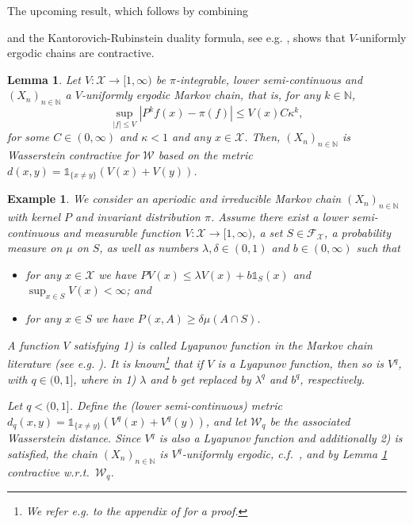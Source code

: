 \documentclass[12pt]{article}
\theoremstyle{plain}
\newtheorem{lem}[thm]{Lemma}
\newtheorem{example}[thm]{Example}
\newcommand{\N}{\mathbb{N}}
\newcommand{\cX}{\mathcal{X}}
\begin{document}
The upcoming result, which follows by combining {\cite[Lemma 2.1]{hairer2011yet} and the Kantorovich-Rubinstein duality formula, see e.g. \cite{villani2009optimal}, shows that $V$-uniformly ergodic chains are contractive. 
\begin{lem}\label{lem:V_uniformly_ergodic_implies_contraction}
Let $V \colon \cX \to [1, \infty)$ be $\pi$-integrable, lower semi-continuous and $(X_n)_{n \in \N}$ a $V$-uniformly ergodic Markov chain, that is, for any $k \in \N$,  
\[
\sup_{\vert f \vert \leq V} \left\vert P^kf(x) - \pi(f) \right\vert \leq V(x)C \kappa^k,
\]
for some $C\in (0, \infty)$ and $\kappa<1$ and any $x \in \cX$. Then,  $(X_n)_{n \in \N}$ is Wasserstein contractive for $\mathcal{W}$ based on the metric $d (x,y) = \mathds{1}_{\{x \neq y\}}(V(x) + V(y))$.
\end{lem}

\begin{example}\label{ex:Lyapunov}
	We consider an aperiodic and irreducible Markov chain $(X_n)_{n \in\N}$ with kernel $P$ and invariant distribution $\pi$. Assume there exist a lower semi-continuous and measurable function $V \colon \cX \to [1, \infty)$, a set $S \in \mathcal{F}_\cX$, a probability measure on $\mu$ on $S$, as well as numbers $\lambda, \delta \in (0,1)$ and $b \in (0, \infty)$ such that 
	\begin{itemize}
		\item[1)] for any $x \in \cX $ we have $PV(x) \leq \lambda V(x) + b \mathds{1}_S(x)$ and $\sup_{x \in S} V(x) < \infty$; and
		\item[2)] for any $x \in S$ we have $P(x, A) \geq\delta \mu(A \cap S)$. 
	\end{itemize}
	A function $V$ satisfying 1) is called \textit{Lyapunov function} in the Markov chain literature (see e.g. \cite{meyn2009markov,douc2018markov}). 
	It is known\footnote{We refer e.g. to the appendix of \cite{hofstadler2024convergenceRates} for a proof.} that if $V$ is a Lyapunov function, then so is $V^q$, with $q \in (0,1]$, where in 1) $\lambda $ and $b$ get replaced by  $\lambda^q$ and $b^q$, respectively.  
	
	Let $q < (0,1]$. 
	Define the (lower semi-continuous) metric $d_q(x,y) = \mathds{1}_{\{x \neq y\}} (V^q(x) + V^q(y))$, and let $\mathcal{W}_q$ be the associated Wasserstein distance. 
	Since $V^q$ is also a Lyapunov function and additionally 2) is satisfied, the chain $(X_n)_{n \in \N}$ is $V^q$-uniformly ergodic, c.f.~\cite{Baxendale2005renewal}, and by Lemma \ref{lem:V_uniformly_ergodic_implies_contraction} contractive w.r.t.~$\mathcal{W}_q$.
\end{example}

}
\end{document}
